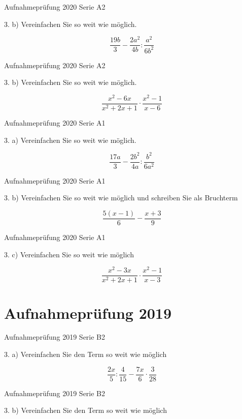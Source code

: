 Aufnahmeprüfung 2020 Serie A2

3. b) Vereinfachen Sie so weit wie möglich.

$$\frac{19b}{3} - \frac{2a^2}{4b} : \frac{a^2}{6b^2}$$

Aufnahmeprüfung 2020 Serie A2

3. b) Vereinfachen Sie so weit wie möglich.

$$\frac{x^2-6x}{x^2+2x+1} \cdot{} \frac{x^2-1}{x-6}$$

Aufnahmeprüfung 2020 Serie A1

3. a) Vereinfachen Sie so weit wie möglich.

$$\frac{17a}{3} - \frac{2b^2}{4a}  :   \frac{b^2}{6a^2}$$

Aufnahmeprüfung 2020 Serie A1

3. b) Vereinfachen Sie so weit wie möglich und schreiben Sie als Bruchterm

$$\frac{5(x-1)}{6} - \frac{x+3}{9}$$

Aufnahmeprüfung 2020 Serie A1

3. c) Vereinfachen Sie so weit wie möglich

$$\frac{x^2-3x}{x^2+2x+1} \cdot{} \frac{x^2-1}{x-3}$$

\section*{Aufnahmeprüfung 2019}
Aufnahmeprüfung 2019 Serie B2

3. a) Vereinfachen Sie den Term so weit wie möglich

$$\frac{2x}{5} : \frac{4}{15} - \frac{7x}{6} \cdot{} \frac{3}{28}$$

Aufnahmeprüfung 2019 Serie B2

3. b) Vereinfachen Sie den Term so weit wie möglich

